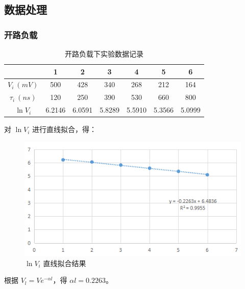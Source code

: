 \documentclass[a4paper]{article}
\begin{document}
    \subsection{数据处理}
    
        \subsubsection{开路负载}

            \begin{table}[H]
                \centering
                \begin{tabular}{|c|c|c|c|c|c|c|}
                    \hline
                                    & 1         & 2         & 3         & 4         & 5         & 6         \\ \hline
                    $V_i\ (mV)$     & 500       & 428       & 340       & 268       & 212       & 164       \\ \hline
                    $\tau_i\ (ns)$  & 120       & 250       & 390       & 530       & 660       & 800       \\ \hline
                    $\ln{V_i}$      & 6.2146    & 6.0591    & 5.8289    & 5.5910    & 5.3566    & 5.0999    \\ \hline
                \end{tabular}
                \caption{开路负载下实验数据记录}
            \end{table}

            \par 对 $\ln{V_i}$ 进行直线拟合，得：

            \begin{figure}[H]
                \centering
                \includegraphics[width=0.7\linewidth]{figures/f1}
                \caption{$\ln{V_i}$ 直线拟合结果}
            \end{figure}

            \par 根据 $V_l=Ve^{-\alpha l}$，得 $\alpha l=0.2263$。
\end{document}

